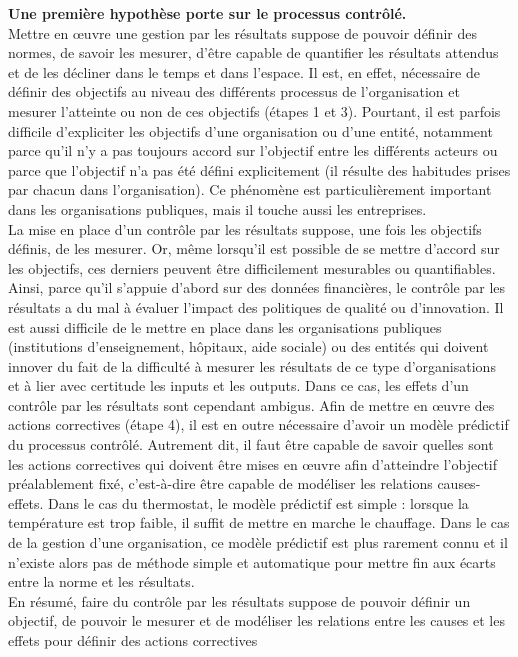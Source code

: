 \documentclass{kaobook}
\begin{document}
\textbf{Une première hypothèse porte sur le processus contrôlé.}\\
Mettre en œuvre une gestion par les résultats suppose de pouvoir définir des normes, de savoir les mesurer, d’être capable de quantifier les résultats attendus et de les décliner dans le temps et dans l’espace. Il est, en effet, nécessaire de définir des objectifs au niveau des différents processus de l’organisation et mesurer l’atteinte ou non de ces objectifs (étapes 1 et 3). Pourtant, il est parfois difficile d’expliciter les objectifs d’une organisation ou d’une entité, notamment parce qu’il n’y a pas toujours accord sur l’objectif entre les différents acteurs ou parce que l’objectif n’a pas été défini explicitement (il résulte des habitudes prises par chacun dans l’organisation). Ce phénomène est particulièrement important dans les organisations publiques, mais il touche aussi les entreprises.\\
La mise en place d’un contrôle par les résultats suppose, une fois les objectifs définis, de les mesurer. Or, même lorsqu’il est possible de se mettre d’accord sur les objectifs, ces derniers peuvent être difficilement mesurables ou quantifiables. Ainsi, parce qu’il s’appuie d’abord sur des données financières, le contrôle par les résultats a du mal à évaluer l’impact des politiques de qualité ou d’innovation. Il est aussi difficile de le mettre en place dans les organisations publiques (institutions d’enseignement, hôpitaux, aide sociale) ou des entités qui doivent innover du fait de la difficulté à mesurer les résultats de ce type d’organisations et à lier avec certitude les inputs et les outputs. Dans ce cas, les effets d’un contrôle par les résultats sont cependant ambigus. Afin de mettre en œuvre des actions correctives (étape 4), il est en outre nécessaire d’avoir un modèle prédictif du processus contrôlé. Autrement dit, il faut être capable de savoir quelles sont les actions correctives qui doivent être mises en œuvre afin d’atteindre l’objectif préalablement fixé, c’est-à-dire être capable de modéliser les relations causes-effets. Dans le cas du thermostat, le modèle prédictif est simple : lorsque la température est trop faible, il suffit de mettre en marche le chauffage. Dans le cas de la gestion d’une organisation, ce modèle prédictif est plus rarement connu et il n’existe alors pas de méthode simple et automatique pour mettre fin aux écarts entre la norme et les résultats.\\
En résumé, faire du contrôle par les résultats suppose de pouvoir définir un objectif, de pouvoir le mesurer et de modéliser les relations entre les causes et les effets pour définir des actions correctives\\
\end{document}
